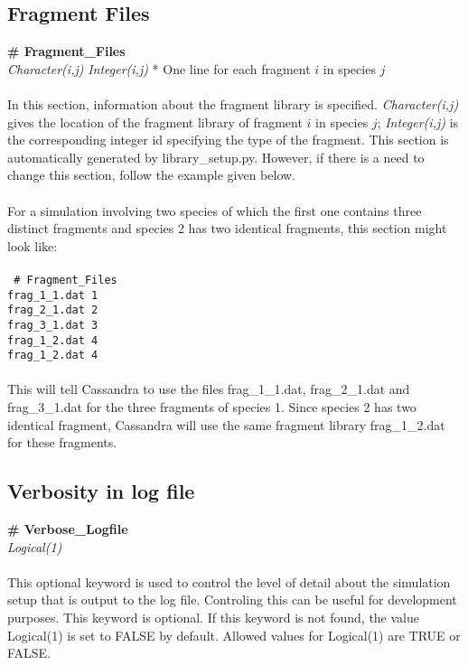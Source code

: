 \subsection{Fragment Files}\label{sec:Fragment_Files}
{\bf \# Fragment\_Files} \\
{\it Character(i,j)} {\it Integer(i,j)} * One line for each fragment $i$ in species $j$ \\ \\
%
In this section, information about the fragment library is specified. {\it Character(i,j)} gives
the location of the fragment library of fragment $i$ in species $j$; {\it Integer(i,j)} is the
corresponding integer id specifying the type of the fragment. This section is automatically
generated by library\_setup.py. However, if there is a need to change this section, follow the example
given below. \\ \\
%
For a simulation involving two species of which the first one contains three distinct fragments and species 2
has two identical fragments, this section might look like: \\ \\
%
\texttt{
\# Fragment\_Files  \\
frag\_1\_1.dat 1 \\
frag\_2\_1.dat 2 \\
frag\_3\_1.dat 3 \\
frag\_1\_2.dat 4 \\
frag\_1\_2.dat 4 \\ \\
}
%
This will tell Cassandra to use the files frag\_1\_1.dat, frag\_2\_1.dat and frag\_3\_1.dat for the three
fragments of species 1. Since species 2 has two identical fragment, Cassandra will use the same
fragment library frag\_1\_2.dat for these fragments. 

%
%

\subsection{Verbosity in log file}\label{sec:Verbose_Logfile}
{\bf \# Verbose\_Logfile} \\
{\it Logical(1)} \\ \\
%
This optional keyword is used to control the level of detail about the simulation
setup that is output to the log file. Controling this can be useful for development
purposes. This keyword is optional. If this keyword is not found,
the value Logical(1) is set to FALSE by default. Allowed values for Logical(1) are
TRUE or FALSE.

